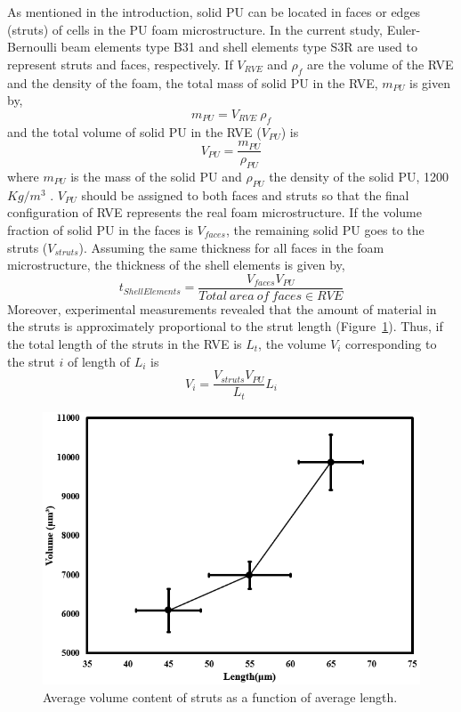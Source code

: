 \documentclass[review]{elsarticle}
\begin{document}
As mentioned in the introduction, solid PU can be located in faces or edges (struts) of cells in the PU foam microstructure. In the current study, Euler-Bernoulli beam elements type B31 and shell elements type S3R are used to represent struts and faces, respectively. If $V_{RVE}$ and $\rho_f$ are the volume of the RVE and the density of the foam, the total mass of solid PU in the RVE, $m_{PU}$ is given by,
\begin{equation}
m_{PU}=V_{RVE}\ \rho_f
\end{equation}
and the total volume of solid PU in the RVE ($V_{PU}$) is
\begin{equation}
V_{PU}=\frac{m_{PU}}{\rho_{PU}}
\end{equation}
where $m_{PU}$ is the mass of the solid PU and   $\rho_{PU}$ the density of the solid PU, 1200 $Kg/m^3$ \citep{Mills2007xvii}. $V_{PU}$ should be assigned to both faces and struts so that the final configuration of RVE represents the real foam microstructure. If the volume fraction of solid PU in the faces is $V_{faces}$, the remaining solid PU goes to the struts ($V_{struts}$). Assuming the same thickness for all faces in the foam microstructure, the thickness of the shell elements is given by,
\begin{equation}
t_{ShellElements}=\frac{V_{faces}V_{PU}}{Total \ area \ of \ faces \in RVE}
\label{ThicknessShellElement}
\end{equation}
Moreover, experimental measurements revealed that the amount of material in the struts is approximately proportional to the strut length (Figure~\ref{fig:StrutContent}). Thus, if the total length of the struts in the RVE is $L_t$, the volume $V_i$ corresponding to the strut $i$ of length of $L_i$ is 
\begin{equation}
V_i=\frac{V_{struts}V_{PU}}{L_t}L_i
\label{TotalLenStruts}
\end{equation}
\begin{figure}[hb]
  \centering
  \includegraphics[scale=0.6]{StrutContent}
  \captionsetup{justification=centering}
  \caption[Close up of \textit{Hemidactylus} sp.]
   {Average volume content of struts as a function of average length.}
   \label{fig:StrutContent}
\end{figure}
\end{document}
